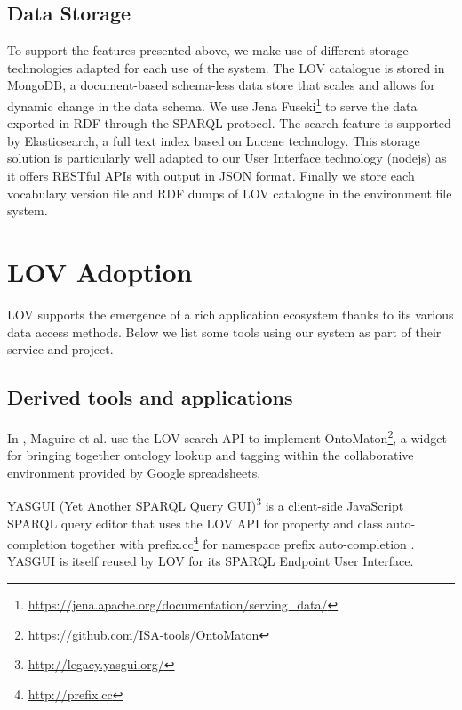 \documentclass{iosart2c}
\begin{document}
\subsection{Data Storage}

To support the features presented above, we make use of different storage technologies adapted for each use of the system. The LOV catalogue is stored in MongoDB\textregistered, a document-based schema-less data store that scales and allows for dynamic change in the data schema. We use Jena Fuseki\footnote{\url{https://jena.apache.org/documentation/serving_data/}} to serve the data exported in RDF through the SPARQL protocol. The search feature is supported by Elasticsearch\textregistered, a full text index based on Lucene technology. This storage solution is particularly well adapted to our User Interface technology (nodejs) as it offers RESTful APIs with output in JSON format. Finally we store each vocabulary version file and RDF dumps of LOV catalogue in the environment file system.



\section{LOV Adoption}
\label{sec:lovecosystem}
LOV supports the emergence of a rich application ecosystem thanks to its various data access methods. Below we list some tools using our system as part of their service and project.
 
\subsection{Derived tools and applications}

In \cite{ontomaton12}, Maguire et al. use the LOV search API to implement OntoMaton\footnote{\url{https://github.com/ISA-tools/OntoMaton}}, a widget for bringing together ontology lookup and tagging within the collaborative environment provided by Google spreadsheets. 

YASGUI (Yet Another SPARQL Query GUI)\footnote{\url{http://legacy.yasgui.org/}} is a client-side JavaScript SPARQL query editor that uses the LOV API for property and class auto-completion together with prefix.cc\footnote{\url{http://prefix.cc}} for namespace prefix auto-completion \cite{yasgui}. YASGUI is itself reused by LOV for its SPARQL Endpoint User Interface.
\end{document}
